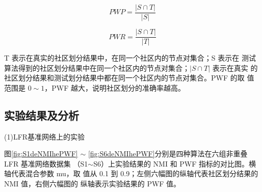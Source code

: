 \begin{equation}
  \label{eqn:pwp}
  PWP=\frac{ \left | S \cap T \right |}{ \left | S \right |}
\end{equation}

\begin{equation}
  \label{eqn:pwr}
  PWR=\frac{ \left | S \cap T \right |}{ \left | T \right |}
\end{equation}

T 表示在真实的社区划分结果中，在同一个社区内的节点对集合；S 表示在
测试算法得到的社区划分结果中在同一个社区内的节点对集合；$\left | S \cap T \right |$ 表示在真实
的社区划分结果和测试划分结果中都在同一个社区内的节点对集合。PWF 的取
值范围是 $0 \sim 1$，PWF 越大，说明社区划分的准确率越高。

\subsection{实验结果及分析}

(1)LFR基准网络上的实验

图\ref{fig:S1deNMIhePWF} $\sim$ \ref{fig:S6deNMIhePWF}分别是四种算法在六组非重叠 LFR 基准网络数据集
（S1$\sim$S6）上实验结果的 NMI 和 PWF 指标的对比图。横轴代表混合参数 mu，取
值从 0.1 到 0.9；左侧六幅图的纵轴代表社区划分结果的 NMI 值，右侧六幅图的
纵轴表示实验结果的 PWF 值。

